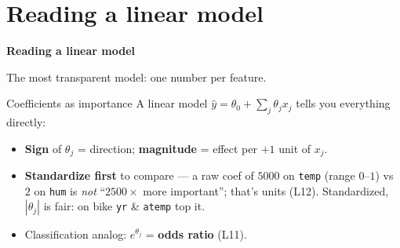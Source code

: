 \documentclass[aspectratio=169]{beamer}
\begin{document}
\section{Reading a linear model}

\begin{frame}[plain]
  \vfill
  \begin{center}
    {\Large\color{popblue}\textbf{Reading a linear model}}\\[0.9em]
    \begin{minipage}{0.82\textwidth}\centering\small
      The most transparent model: one number per feature.
    \end{minipage}
  \end{center}
  \vfill
\end{frame}

\begin{frame}{Coefficients as importance}
  A linear model $\hat y = \theta_0 + \sum_j \theta_j x_j$ tells you everything directly:
  \begin{itemize}\small
    \item \textbf{Sign} of $\theta_j$ = direction; \textbf{magnitude} = effect per $+1$ unit of $x_j$.
    \item \textbf{Standardize first} to compare --- a raw coef of $5000$ on \texttt{temp} (range
      $0$--$1$) vs $2$ on \texttt{hum} is \emph{not} ``$2500\times$ more important''; that's units
      (L12). Standardized, $|\theta_j|$ is fair: on bike \texttt{yr} \& \texttt{atemp} top it.
    \item Classification analog: $e^{\theta_j}$ = \textbf{odds ratio} (L11).
  \end{itemize}
  \vfill
\end{frame}
\end{document}
